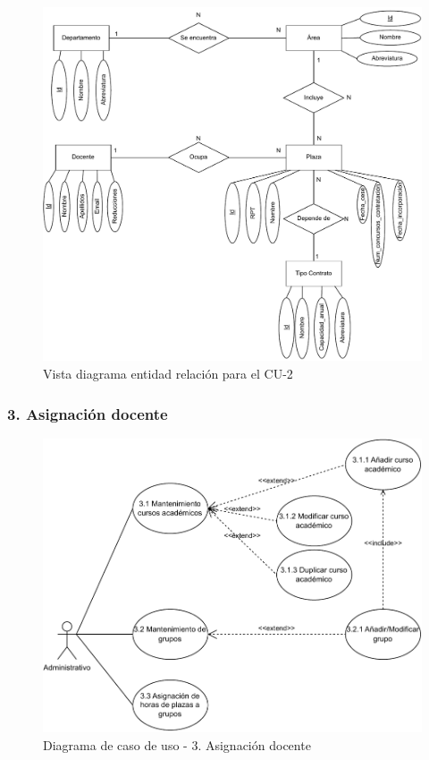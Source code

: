 \begin{figure}[!h]
	\centering
	\includegraphics[scale=0.7]{../img/Anexos/Casos uso/Vistas ER/Diagrama E-R CU 2.pdf}
	\caption{Vista diagrama entidad relación para el CU-2}\label{er_cu2}
\end{figure}
\FloatBarrier

\newpage
\subsubsection{3. Asignación docente}
\begin{figure}[!h]
	\centering
	\includegraphics[scale=0.9]{../img/Anexos/Casos uso/Diagrama casos de uso 4.pdf}
	\caption{Diagrama de caso de uso - 3. Asignación docente}
\end{figure}
\FloatBarrier

